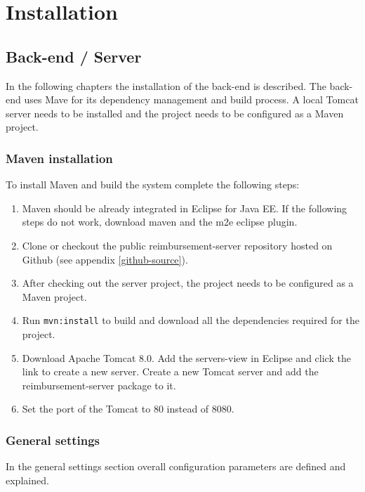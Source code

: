 \appendix

\chapter{Installation}
\label{chap:installation}

\section{Back-end / Server}
\label{sec:backend-server}

In the following chapters the installation of the back-end is described. The back-end uses Mave for its dependency management and build process. A local Tomcat server needs to be installed and the project needs to be configured as a Maven project.

\subsection{Maven installation}
To install Maven and build the system complete the following steps:

\begin{enumerate}
    \item Maven should be already integrated in Eclipse for Java EE. If the following steps do not work, download maven and the m2e eclipse plugin.
    \item Clone or checkout the public reimbursement-server repository hosted on Github (see appendix \ref{github-source}).
    \item After checking out the server project, the project needs to be configured as a Maven project.
    \item Run \texttt{mvn:install} to build and download all the dependencies required for the project.
    \item Download Apache Tomcat 8.0. Add the servers-view in Eclipse and click the link to create a new server. Create a new Tomcat server and add the reimbursement-server package to it.
    \item Set the port of the Tomcat to 80 instead of 8080.
\end{enumerate}

\subsection{General settings}

In the general settings section overall configuration parameters are defined and explained.

